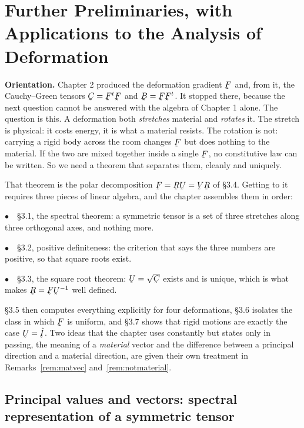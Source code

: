 
\chapter{Further Preliminaries, with Applications to the Analysis of Deformation}




\noindent
\textbf{\large Orientation.}\quad
Chapter 2 produced the deformation gradient $\bF$ and, from it, the
Cauchy--Green tensors $\bC=\bF^{t}\bF$ and $\bB=\bF\bF^{t}$. It stopped
there, because the next question cannot be answered with the algebra of
Chapter 1 alone. The question is this. A deformation both \emph{stretches}
material and \emph{rotates} it. The stretch is physical: it costs energy,
it is what a material resists. The rotation is not: carrying a rigid body
across the room changes $\bF$ but does nothing to the material. If the two
are mixed together inside a single $\bF$, no constitutive law can be
written. So we need a theorem that separates them, cleanly and uniquely.

That theorem is the polar decomposition $\bF=\bR\bU=\bV\bR$ of \S3.4.
Getting to it requires three pieces of linear algebra, and the chapter
assembles them in order:

\smallskip
\noindent
$\bullet$\ \ \S3.1, the spectral theorem: a symmetric tensor is a set of
three stretches along three orthogonal axes, and nothing more.

\noindent
$\bullet$\ \ \S3.2, positive definiteness: the criterion that says the
three numbers are positive, so that square roots exist.

\noindent
$\bullet$\ \ \S3.3, the square root theorem: $\bU=\sqrt{\bC}$ exists and is
unique, which is what makes $\bR=\bF\bU^{-1}$ well defined.

\smallskip
\noindent
\S3.5 then computes everything explicitly for four deformations, \S3.6
isolates the class in which $\bF$ is uniform, and \S3.7 shows that rigid
motions are exactly the case $\bU=\hI$. Two ideas that the chapter uses
constantly but states only in passing, the meaning of a \emph{material}
vector and the difference between a principal direction and a material
direction, are given their own treatment in
Remarks~\ref{rem:matvec} and~\ref{rem:notmaterial}.


\section{Principal values and vectors: spectral representation
         of a symmetric tensor}\label{sec:spectral}

